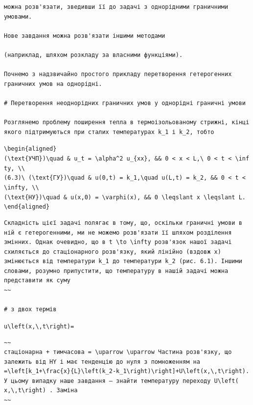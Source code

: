 \documentclass[
  ukrainian,
]{article}
\begin{document}
\begin{verbatim}
можна розв'язати, зведивши її до задачі з однорідними граничними умовами.

Нове завдання можна розв'язати іншими методами

(наприклад, шляхом розкладу за власними функціями).

Почнемо з надзвичайно простого прикладу перетворення гетерогенних граничних умов на однорідні.

# Перетворення неоднорідних граничних умов у однорідні граничні умови

Розглянемо проблему поширення тепла в термоізольованому стрижні, кінці якого підтримуються при сталих температурах k_1 і k_2, тобто
\end{verbatim}

\texttt{\textbackslash{}begin\{aligned\}}
\texttt{(\textbackslash{}text\{УЧП\})\textbackslash{}quad\ \&\ u\_t\ =\ \textbackslash{}alpha\^{}2\ u\_\{xx\},\ \&\&\ 0\ \textless{}\ x\ \textless{}\ L,\textbackslash{}\ 0\ \textless{}\ t\ \textless{}\ \textbackslash{}infty,\ \textbackslash{}\textbackslash{}}
\texttt{(6.3)\textbackslash{}\ (\textbackslash{}text\{ГУ\})\textbackslash{}quad\ \&\ u(0,t)\ =\ k\_1,\textbackslash{}quad\ u(L,t)\ =\ k\_2,\ \&\&\ 0\ \textless{}\ t\ \textless{}\ \textbackslash{}infty,\ \textbackslash{}\textbackslash{}}
\texttt{(\textbackslash{}text\{НУ\})\textbackslash{}quad\ \&\ u(x,0)\ =\ \textbackslash{}varphi(x),\ \&\&\ 0\ \textbackslash{}leqslant\ x\ \textbackslash{}leqslant\ L.}
\texttt{\textbackslash{}end\{aligned\}}

\begin{verbatim}
Складність цієї задачі полягає в тому, що, оскільки граничні умови в ній є гетерогенними, ми не можемо розв'язати її шляхом розділення змінних. Однак очевидно, що в t \to \infty розв'язок нашої задачі схиляється до стаціонарного розв'язку, який лінійно (вздовж x) змінюється від температури k_1 до температури k_2 (рис. 6.1). Іншими словами, розумно припустити, що температуру в нашій задачі можна представити як суму
~~

# з двох термів
\end{verbatim}

\texttt{u\textbackslash{}left(x,\textbackslash{},t\textbackslash{}right)=}

\begin{verbatim}
~~
стаціонарна + тимчасова = \uparrow \uparrow Частина розв'язку, що залежить від HY і має тенденцію до нуля з помноженням на =\left[k_1+\frac{x}{L}\left(k_2-k_1\right)\right]+U\left(x,\,t\right). У цьому випадку наше завдання — знайти температуру переходу U\left( x,\,t\right) . Заміна
~~
\end{verbatim}
\end{document}
